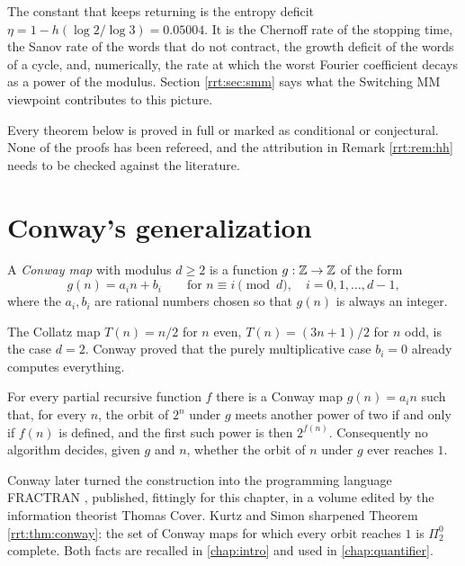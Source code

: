 The constant that keeps returning is the entropy deficit $\eta=1-h(\log 2/\log 3)=0.05004$. It is the Chernoff rate of the stopping time, the Sanov rate of the words that do not contract, the growth deficit of the words of a cycle, and, numerically, the rate at which the worst Fourier coefficient decays as a power of the modulus. Section \ref{rrt:sec:smm} says what the Switching MM viewpoint contributes to this picture.

Every theorem below is proved in full or marked as conditional or conjectural. None of the proofs has been refereed, and the attribution in Remark \ref{rrt:rem:hh} needs to be checked against the literature.


\section{Conway's generalization}\label{rrt:sec:conway}

\begin{definition}
A \emph{Conway map} with modulus $d\ge 2$ is a function $g:\mathbb{Z}\to\mathbb{Z}$ of the form
\[
g(n) = a_i n + b_i \qquad \text{for } n\equiv i \pmod d,\quad i=0,1,\dots,d-1,
\]
where the $a_i,b_i$ are rational numbers chosen so that $g(n)$ is always an integer.
\end{definition}

The Collatz map $T(n)=n/2$ for $n$ even, $T(n)=(3n+1)/2$ for $n$ odd, is the case $d=2$. Conway \cite{conway1972} proved that the purely multiplicative case $b_i=0$ already computes everything.

\begin{theorem}[Conway 1972]\label{rrt:thm:conway}
For every partial recursive function $f$ there is a Conway map $g(n)=a_i n$ such that, for every $n$, the orbit of $2^n$ under $g$ meets another power of two if and only if $f(n)$ is defined, and the first such power is then $2^{f(n)}$. Consequently no algorithm decides, given $g$ and $n$, whether the orbit of $n$ under $g$ ever reaches $1$.
\end{theorem}

Conway later turned the construction into the programming language FRACTRAN \cite{conway1987}, published, fittingly for this chapter, in a volume edited by the information theorist Thomas Cover. Kurtz and Simon \cite{kurtz2007} sharpened Theorem \ref{rrt:thm:conway}: the set of Conway maps for which every orbit reaches $1$ is $\Pi^0_2$ complete. Both facts are recalled in \cref{chap:intro} and used in \cref{chap:quantifier}.

